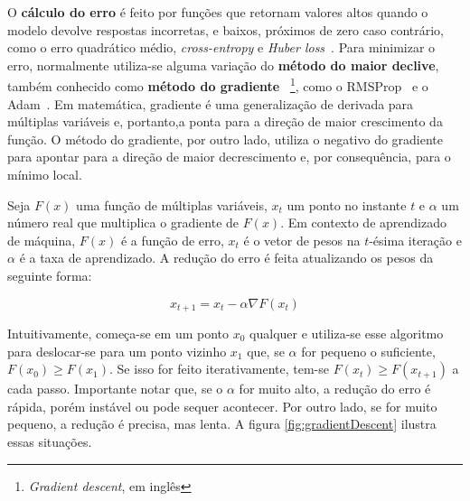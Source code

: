 O \textbf{cálculo do erro} é feito por funções que retornam valores altos quando o modelo devolve respostas incorretas, e baixos, próximos de zero caso contrário, como o erro quadrático médio, \textit{cross-entropy} e \textit{Huber loss}~\cite{huber_loss}.
Para minimizar o erro, normalmente utiliza-se alguma variação do \textbf{método do maior declive}, também conhecido como \textbf{método do gradiente}~\cite{cauchy1847} \footnote{\textit{Gradient descent}, em inglês}, como o RMSProp~\cite{rmsprop} e o Adam~\cite{DBLP:journals/corr/KingmaB14}.
Em matemática, gradiente é uma generalização de derivada para múltiplas variáveis e, portanto,a ponta para a direção de maior crescimento da função.
O método do gradiente, por outro lado, utiliza o negativo do gradiente para apontar para a direção de maior decrescimento e, por consequência, para o mínimo local.

Seja $F(x)$ uma função de múltiplas variáveis, $x_{t}$ um ponto no instante $t$ e $\alpha$ um número real que multiplica o gradiente de $F(x)$.
Em contexto de aprendizado de máquina, $F(x)$ é a função de erro, $x_{t}$ é o vetor de pesos na $t$-ésima iteração e $\alpha$ é a taxa de aprendizado.
A redução do erro é feita atualizando os pesos da seguinte forma:

\begin{equation} \label{eq:error_update}
x_{t+1} = x_{t} - \alpha \nabla F(x_{t})
\end{equation}

Intuitivamente, começa-se em um ponto $x_{0}$ qualquer e utiliza-se esse algoritmo para deslocar-se para um ponto vizinho $x_{1}$ que, se $\alpha$ for pequeno o suficiente, $F(x_{0}) \geq F(x_{1})$.
Se isso for feito iterativamente, tem-se $F(x_{t}) \geq F(x_{t+1})$ a cada passo.
Importante notar que, se o $\alpha$ for muito alto, a redução do erro é rápida, porém instável ou pode sequer acontecer.
Por outro lado, se for muito pequeno, a redução é precisa, mas lenta.
A figura \ref{fig:gradientDescent} ilustra essas situações.

